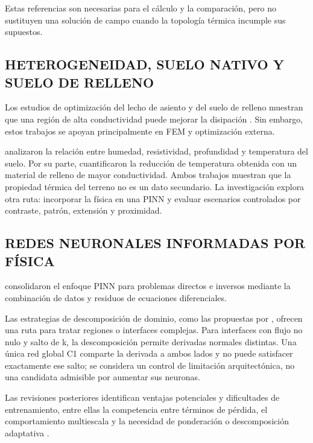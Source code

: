 Estas referencias son necesarias para el cálculo y la comparación, pero no sustituyen una solución de campo cuando la topología térmica incumple sus supuestos.

\subsection{HETEROGENEIDAD, SUELO NATIVO Y SUELO DE RELLENO}

Los estudios de optimización del lecho de asiento y del suelo de relleno muestran que una región de alta conductividad puede mejorar la disipación \parencites[1--3]{oclon2015}[1--4]{atoccsa2024}. Sin embargo, estos trabajos se apoyan principalmente en FEM y optimización externa.

\textcite[1,6--9]{khumalo2025} analizaron la relación entre humedad, resistividad, profundidad y temperatura del suelo. Por su parte, \textcite[1,10,16]{kim2025} cuantificaron la reducción de temperatura obtenida con un material de relleno de mayor conductividad. Ambos trabajos muestran que la propiedad térmica del terreno no es un dato secundario. La investigación explora otra ruta: incorporar la física en una PINN y evaluar escenarios controlados por contraste, patrón, extensión y proximidad.

\subsection{REDES NEURONALES INFORMADAS POR FÍSICA}

\textcite[4--5]{raissi2017} consolidaron el enfoque PINN para problemas directos e inversos mediante la combinación de datos y residuos de ecuaciones diferenciales.

Las estrategias de descomposición de dominio, como las propuestas por \textcite[1--2]{shukla2021}, ofrecen una ruta para tratar regiones o interfaces complejas. Para interfaces con flujo no nulo y salto de k, la descomposición permite derivadas normales distintas. Una única red global C1 comparte la derivada a ambos lados y no puede satisfacer exactamente ese salto; se considera un control de limitación arquitectónica, no una candidata admisible por aumentar sus neuronas.

Las revisiones posteriores identifican ventajas potenciales y dificultades de entrenamiento, entre ellas la competencia entre términos de pérdida, el comportamiento multiescala y la necesidad de ponderación o descomposición adaptativa \parencites[1--2,14--17]{lawal2022}[2--6]{ren2025}.

